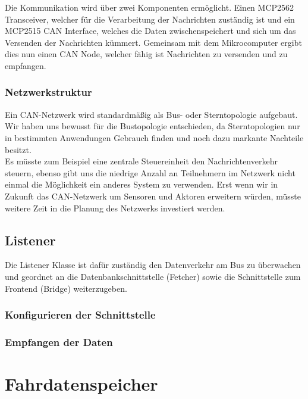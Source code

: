 Die Kommunikation wird über zwei Komponenten ermöglicht. Einen MCP2562 Transceiver, welcher für die Verarbeitung der Nachrichten zuständig ist und ein MCP2515 CAN Interface, welches die Daten zwischenspeichert und sich um das Versenden der Nachrichten kümmert. Gemeinsam mit dem Mikrocomputer ergibt dies nun einen CAN Node, welcher fähig ist Nachrichten zu versenden und zu empfangen.

\subsubsection{Netzwerkstruktur}

Ein CAN-Netzwerk wird standardmäßig als Bus- oder Sterntopologie aufgebaut. Wir haben uns bewusst für die Bustopologie entschieden, da Sterntopologien nur in bestimmten Anwendungen Gebrauch finden und noch dazu markante Nachteile besitzt.\\ Es müsste zum Beispiel eine zentrale Steuereinheit den Nachrichtenverkehr steuern, ebenso gibt uns die niedrige Anzahl an Teilnehmern im Netzwerk nicht einmal die Möglichkeit ein anderes System zu verwenden. Erst wenn wir in Zukunft das CAN-Netzwerk um Sensoren und Aktoren erweitern würden, müsste weitere Zeit in die Planung des Netzwerks investiert werden. 

\newpage

\subsection{Listener}

Die Listener Klasse ist dafür zuständig den Datenverkehr am Bus zu überwachen und geordnet an die Datenbankschnittstelle (Fetcher) sowie die Schnittstelle zum Frontend (Bridge) weiterzugeben.

\subsubsection{Konfigurieren der Schnittstelle}


\subsubsection{Empfangen der Daten}

\newpage


\section{Fahrdatenspeicher}
